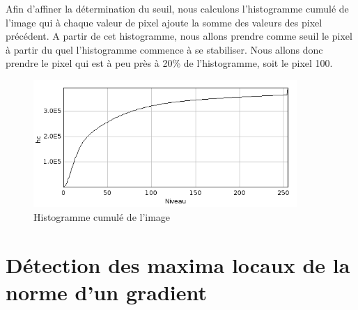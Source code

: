 \documentclass[a4paper,11pt]{article}
\begin{document}
  Afin d'affiner la détermination du seuil, nous calculons l'histogramme cumulé de l'image qui à chaque valeur
  de pixel ajoute la somme des valeurs des pixel précédent. A partir de cet histogramme, nous allons prendre
  comme seuil le pixel à partir du quel l'histogramme commence à se stabiliser. Nous allons donc prendre le pixel
  qui est à peu près à 20\% de l'histogramme, soit le pixel 100.
  
  \begin{figure}[H]
  \center
   \includegraphics[width=10cm]{../histoCumul.png}
   \caption{Histogramme cumulé de l'image}
  \end{figure}
  
  \section{Détection des maxima locaux de la norme d'un gradient}
\end{document}
